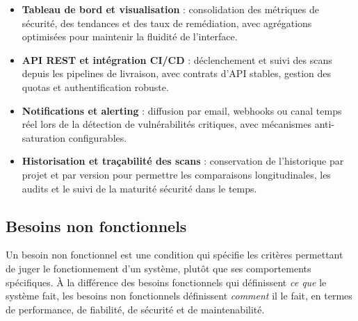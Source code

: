 \begin{itemize}
  \item \textbf{Tableau de bord et visualisation} : consolidation des métriques de
  sécurité, des tendances et des taux de remédiation, avec agrégations optimisées pour
  maintenir la fluidité de l'interface.

  \item \textbf{API REST et intégration CI/CD} : déclenchement et suivi des scans depuis
  les pipelines de livraison, avec contrats d'API stables, gestion des quotas et
  authentification robuste.

  \item \textbf{Notifications et alerting} : diffusion par email, webhooks ou canal
  temps réel lors de la détection de vulnérabilités critiques, avec mécanismes
  anti-saturation configurables.

  \item \textbf{Historisation et traçabilité des scans} : conservation de l'historique
  par projet et par version pour permettre les comparaisons longitudinales, les audits
  et le suivi de la maturité sécurité dans le temps.
\end{itemize}

\subsection{Besoins non fonctionnels}

Un besoin non fonctionnel est une condition qui spécifie les critères permettant
de juger le fonctionnement d'un système, plutôt que ses comportements spécifiques.
À la différence des besoins fonctionnels qui définissent \textit{ce que} le système
fait, les besoins non fonctionnels définissent \textit{comment} il le fait, en termes
de performance, de fiabilité, de sécurité et de maintenabilité.

